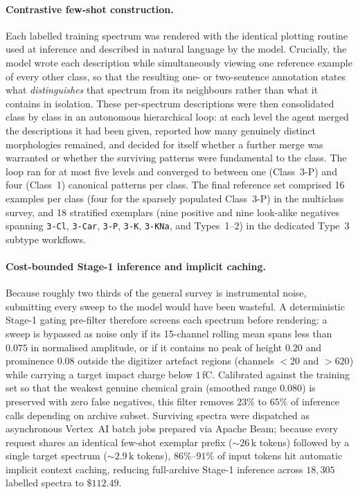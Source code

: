 \documentclass[twocolumn,a4paper,10pt]{article}
\begin{document}
\paragraph{Contrastive few-shot construction.}
Each labelled training spectrum was rendered with the identical plotting
routine used at inference and described in natural language by the model.
Crucially, the model wrote each description while simultaneously viewing one
reference example of every other class, so that the resulting one- or
two-sentence annotation states what \emph{distinguishes} that spectrum from
its neighbours rather than what it contains in isolation. These per-spectrum
descriptions were then consolidated class by class in an autonomous
hierarchical loop: at each level the agent merged the descriptions it had been
given, reported how many genuinely distinct morphologies remained, and decided
for itself whether a further merge was warranted or whether the surviving
patterns were fundamental to the class. The loop ran for at most five levels
and converged to between one (Class~3-P) and four (Class~1) canonical patterns
per class. The final reference set comprised 16 examples per class (four for
the sparsely populated Class~3-P) in the multiclass survey, and 18 stratified
exemplars (nine positive and nine look-alike negatives spanning \texttt{3-Cl},
\texttt{3-Car}, \texttt{3-P}, \texttt{3-K}, \texttt{3-KNa}, and Types~1--2) in
the dedicated Type~3 subtype workflows.

\paragraph{Cost-bounded Stage-1 inference and implicit caching.}
Because roughly two thirds of the general survey is instrumental noise,
submitting every sweep to the model would have been wasteful. A deterministic
Stage-1 gating pre-filter therefore screens each spectrum before rendering: a
sweep is bypassed as noise only if its 15-channel rolling mean spans less than
$0.075$ in normalised amplitude, or if it contains no peak of height $0.20$ and
prominence $0.08$ outside the digitizer artefact regions (channels $<20$ and
$>620$) while carrying a target impact charge below $1$\,fC. Calibrated against
the training set so that the weakest genuine chemical grain (smoothed range
$0.080$) is preserved with zero false negatives, this filter removes $23\%$ to
$65\%$ of inference calls depending on archive subset. Surviving spectra were
dispatched as asynchronous Vertex~AI batch jobs prepared via Apache Beam;
because every request shares an identical few-shot exemplar prefix
($\sim 26\,\text{k}$ tokens) followed by a single target spectrum
($\sim 2.9\,\text{k}$ tokens), $86\%$--$91\%$ of input tokens hit automatic
implicit context caching, reducing full-archive Stage-1 inference across
$18{,}305$ labelled spectra to $\$112.49$.
\end{document}

